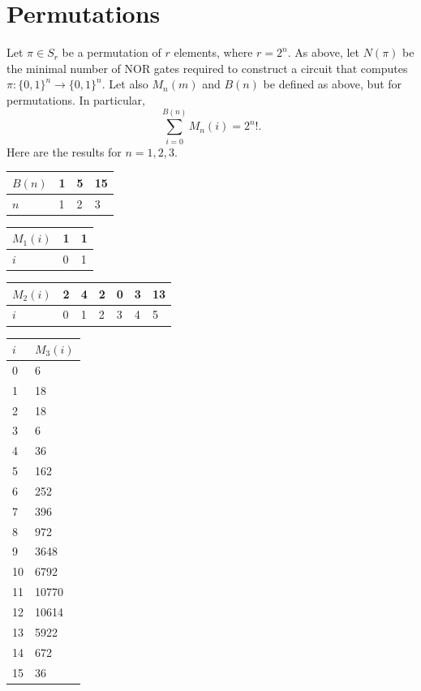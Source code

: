 \documentclass[12pt]{amsart}
\begin{document}
\section{Permutations}
Let $\pi \in S_r$ be a permutation of $r$ elements, where $r=2^n$. As above, let $N(\pi)$ be the minimal number of NOR gates required to construct a circuit that computes $\pi: \{0,1\}^n \rightarrow \{0,1\}^n$. Let also $M_n(m)$ and $B(n)$ be defined as above, but for permutations. In particular,
\[\sum_{i=0}^{B(n)} M_n(i)=2^n!.\]
Here are the results for $n=1,2,3$.
\begin{table}[H]
\begin{tabular}{|l|l|l|l|}
\hline
$B(n)$ & 1 & 5 & 15 \\ \hline
$n$    & 1 & 2 & 3  \\ \hline
\end{tabular}
\end{table}
\begin{table}[H]
\begin{tabular}{|l|l|l|}
\hline
$M_1(i)$ & 1 & 1 \\ \hline
$i$       & 0 & 1 \\ \hline
\end{tabular}
\end{table}

\begin{table}[H]
\begin{tabular}{|l|l|l|l|l|l|l|}
\hline
$M_2(i)$ & 2 & 4 & 2 & 0 & 3 & 13 \\ \hline
$i$       & 0 & 1 & 2 & 3 & 4 & 5  \\ \hline
\end{tabular}
\end{table}

\begin{table}[H]
\begin{tabular}{|l|l|}
\hline
$i$  & $M_3(i)$ \\ \hline
0  & 6       \\ \hline
1  & 18      \\ \hline
2  & 18      \\ \hline
3  & 6       \\ \hline
4  & 36      \\ \hline
5  & 162     \\ \hline
6  & 252     \\ \hline
7  & 396     \\ \hline
8  & 972     \\ \hline
9  & 3648    \\ \hline
10 & 6792    \\ \hline
11 & 10770   \\ \hline
12 & 10614   \\ \hline
13 & 5922    \\ \hline
14 & 672    \\ \hline
15 & 36    \\ \hline
\end{tabular}
\end{table}
\end{document}

